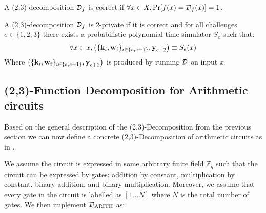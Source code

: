 \begin{definition}[Correctness]
\label{def:decomp_correctness}
A (2,3)-decomposition $\mathcal{D}_{f}$ is correct if
$\forall x \in X, \operatorname{Pr}[f(x) = \mathcal{D}_{f}(x)] = 1$.
\end{definition}

\begin{definition}[Privacy]
\label{def:decomp_privacy}
A (2,3)-decomposition $\mathcal{D}_{f}$ is 2-private if it is correct and for all challenges
$e \in \{1,2,3\}$ there exists a probabilistic polynomial time simulator $S_{e}$
such that:
\[
  \forall x \in x, \left(\{\textbf{k}_{i}, \textbf{w}_{i} \}_{i \in \{e, e+1\}}, \textbf{y}_{e+2} \right)
  \equiv S_{e}(x)
\]
Where $\left(\{\textbf{k}_{i}, \textbf{w}_{i} \}_{i \in \{e, e+1\}}, \textbf{y}_{e+2}
\right)$ is produced by running $\mathcal{D}$ on input $x$
\end{definition}

\subsection{(2,3)-Function Decomposition for Arithmetic circuits}
\label{subsec:general:arith}
Based on the general description of the (2,3)-Decomposition from the previous
section we can now define a concrete (2,3)-Decomposition of arithmetic circuits
as in \citet{zkboo}.

We assume the circuit is expressed in some arbitrary finite field
$\mathbb{Z}_{q}$ such that the circuit can be expressed by gates: addition by constant,
multiplication by constant, binary addition, and binary multiplication.
Moreover, we assume that every gate in the circuit is labelled as $[1 \dots N]$ where $N$ is
the total number of gates.
We then implement $\mathcal{D}_{\text{ARITH}}$ as:

